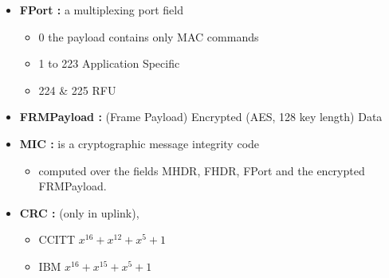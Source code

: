 \begin{landscape}
\begin{multicols}{2}
\begin{itemize}
	\item \textbf{FPort :}  a multiplexing port field
	\begin{itemize}
		\item 0  the payload contains only MAC commands
		 \item 1 to 223  Application Specific
		 \item 224 \& 225  RFU
	\end{itemize}
    \item \textbf{FRMPayload :} (Frame Payload)  Encrypted (AES, 128 key length) Data                                 
	\item \textbf{MIC :}  is a cryptographic message integrity code
	\begin{itemize}
		\item computed over the fields MHDR, FHDR, FPort and the encrypted FRMPayload.
	\end{itemize}
	\item \textbf{CRC :} (only in uplink), 
	\begin{itemize}
		\item CCITT  $x^{16} + x^{12} + x^{5} + 1$
		\item IBM  $x^{16} + x^{15} + x^{5} + 1$
	\end{itemize}
\end{itemize}

\end{multicols}


\end{landscape}


